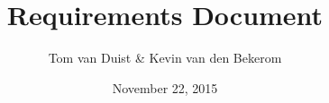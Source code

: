 

\title{Requirements Document}
\newcommand{\TitelAbbr}{RD}
\newcommand{\Version}{0.1}
\newcommand{\rreport}{Intermediate Requirements Engineering report}



\supervisors{}
\author{Tom van Duist \& Kevin van den Bekerom}
\date{November 22, 2015}





\maketitle


\tableofcontents




\clearpage



